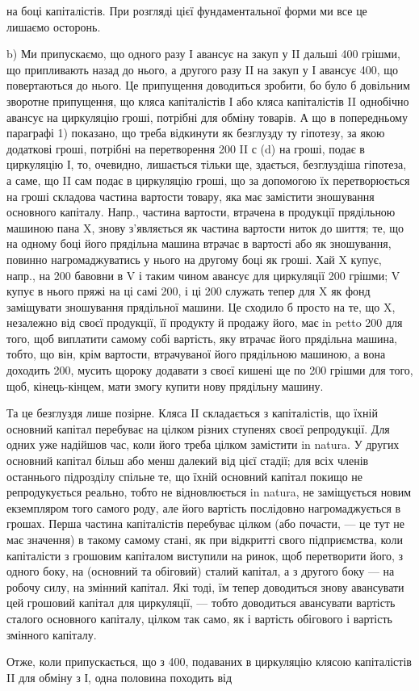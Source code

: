 \parcont{}  %
на боці капіталістів. При розгляді цієї фундаментальної форми ми все це
лишаємо осторонь.

b) Ми припускаємо, що одного разу І авансує на закуп у II дальші
400 грішми, що припливають назад до нього, а другого разу
II на закуп у І авансує 400, що повертаються до нього. Це
припущення доводиться зробити, бо було б довільним зворотне припущення,
що кляса капіталістів І або кляса капіталістів II однобічно авансує
на циркуляцію гроші, потрібні для обміну товарів. А що в попередньому
параграфі 1) показано, що треба відкинути як безглузду ту гіпотезу, за
якою додаткові гроші, потрібні на перетворення 200 II с (d) на гроші,
подає в циркуляцію І, то, очевидно, лишається тільки ще, здається, безглуздіша
гіпотеза, а саме, що II сам подає в циркуляцію гроші, що за допомогою
їх перетворюється на гроші складова частина вартости товару,
яка має замістити зношування основного капіталу. Напр., частина вартости,
втрачена в продукції прядільною машиною пана X, знову з’являється
як частина вартости ниток до шиття; те, що на одному боці його прядільна
машина втрачає в вартості або як зношування, повинно нагромаджуватись
у нього на другому боці як гроші. Хай X купує, напр., на
200 бавовни в V і таким чином авансує для циркуляції 200 грішми; V купує в нього пряжі на ці самі 200, і ці
200 служать тепер для X як фонд заміщувати зношування прядільної
машини. Це сходило б просто на те, що X, незалежно від своєї
продукції, її продукту й продажу його, має in petto 200 для
того, щоб виплатити самому собі вартість, яку втрачає його прядільна
машина, тобто, що він, крім вартости, втрачуваної його прядільною машиною,
а вона доходить 200, мусить щороку додавати з своєї
кишені ще по 200 грішми для того, щоб, кінець-кінцем, мати
змогу купити нову прядільну машину.

Та це безглуздя лише позірне. Кляса II складається з капіталістів,
що їхній основний капітал перебуває на цілком різних ступенях своєї
репродукції. Для одних уже надійшов час, коли його треба цілком замістити
in natura. У других основний капітал більш або менш далекий
від цієї стадії; для всіх членів останнього підрозділу спільне те, що їхній
основний капітал покищо не репродукується реально, тобто не відновлюється
in natura, не заміщується новим екземпляром того самого роду,
але його вартість послідовно нагромаджується в грошах. Перша частина
капіталістів перебуває цілком (або почасти, — це тут не має значення)
в такому самому стані, як при відкритті свого підприємства, коли капіталісти
з грошовим капіталом виступили на ринок, щоб перетворити його,
з одного боку, на (основний та обіговий) сталий капітал, а з другого
боку — на робочу силу, на змінний капітал. Які тоді, їм тепер доводиться
знову авансувати цей грошовий капітал для циркуляції, — тобто доводиться
авансувати вартість сталого основного капіталу, цілком так само, як і вартість
обігового і вартість змінного капіталу.

Отже, коли припускається, що з 400, подаваних в циркуляцію
клясою капіталістів II для обміну з І, одна половина походить від
\parbreak{}  %
